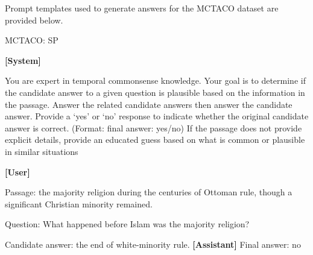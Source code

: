 

Prompt templates used to generate answers for the MCTACO dataset are provided below.

\begin{myColorbox}[]{MCTACO: SP}

\textbf{[System]}

You are expert in temporal commonsense knowledge. Your goal is to determine if the candidate answer to a given question is plausible based on the information in the passage. Answer the related candidate answers then answer the candidate answer. Provide a `yes' or `no' response to indicate whether the original candidate answer is correct. (Format: final answer: yes/no)
If the passage does not provide explicit details, provide an educated guess based on what is common or plausible in similar situations

\textbf{[User]}

Passage: the majority religion during the centuries of Ottoman rule, though a significant Christian minority remained. 

Question: What happened before Islam was the majority religion? 

Candidate answer: the end of white-minority rule.
\newline 
\textbf{[Assistant]}
\newline
Final answer: no
\end{myColorbox}

